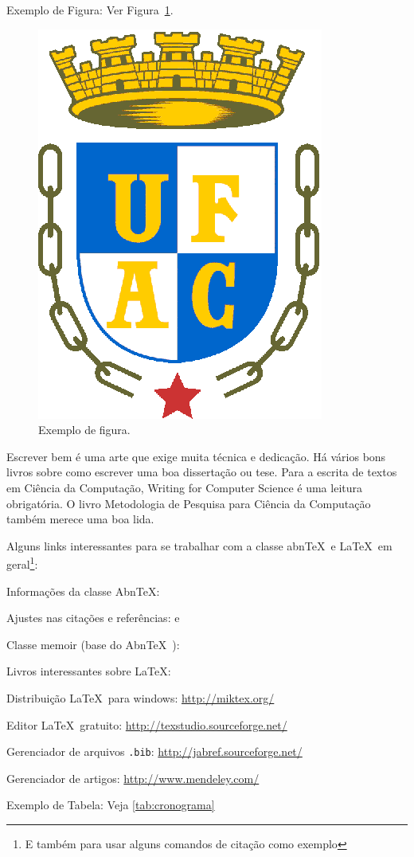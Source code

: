 \documentclass[
	12pt,				    %
	openright,			    %
	oneside,			    %
	a4paper,			    %
    sumario=tradicional,    %
	english,			    %
	brazil,				    %
	]{abntex2}
\begin{document}
Exemplo de Figura: Ver Figura~\ref{fig:exefig}.

\begin{figure}[!ht]
\centering
\includegraphics[width=0.3\linewidth]{figuras/exefig.eps}
\caption{Exemplo de figura.}
\label{fig:exefig}
\end{figure}

Escrever bem é uma arte que exige muita técnica e dedicação. Há vários bons livros sobre como escrever uma boa dissertação ou tese. Para a escrita de textos em Ciência da Computação, Writing for Computer Science \cite{zobel2014} é uma leitura obrigatória. O livro Metodologia de Pesquisa para Ciência da Computação \cite{wazlawick2009} também merece uma boa lida. 

Alguns links interessantes para se trabalhar com a classe abn\TeX\ e \LaTeX\ em geral\footnote{E também para usar alguns comandos de citação como exemplo}:
\begin{alineas}
  \item Informações da classe Abn\TeX : 
  \item Ajustes nas citações e referências:  e 
  \item Classe memoir (base do Abn\TeX\ ): 
  \item Livros interessantes sobre \LaTeX: \cite{Dongen2012,LeslieLamport90,FrankMittelbach111,Dongen2012}
  \item Distribuição \LaTeX\ para windows: \url{http://miktex.org/}
  \item Editor \LaTeX\ gratuito: \url{http://texstudio.sourceforge.net/}
  \item Gerenciador de arquivos \texttt{.bib}: \url{http://jabref.sourceforge.net/}
  \item Gerenciador de artigos: \url{http://www.mendeley.com/}
  \item Exemplo de Tabela: Veja \autoref{tab:cronograma}
\end{alineas}
\end{document}
